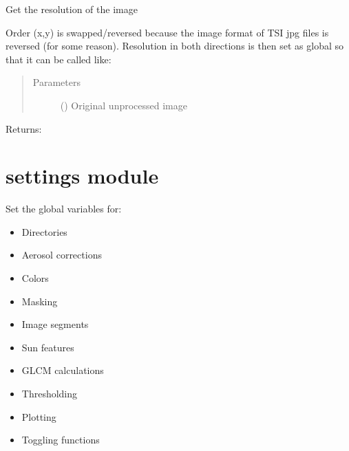 \documentclass[letterpaper,10pt,english]{sphinxmanual}
\begin{document}
\begin{fulllineitems}
\label{\detokenize{resolution:resolution.get_resolution}}
Get the resolution of the image

Order (x,y) is swapped/reversed because the image format of TSI jpg files is reversed (for some reason). Resolution
in both directions is then set as global so that it can be called like:

%
\begin{sphinxVerbatim}[commandchars=\\\{\}]
\end{sphinxVerbatim}
\begin{quote}\begin{description}
\item[{Parameters}] \leavevmode
{} () \textendash{} Original unprocessed image

\end{description}\end{quote}

Returns:

\end{fulllineitems}



\section{settings module}
\label{\detokenize{settings:settings-module}}\label{\detokenize{settings::doc}}\label{\detokenize{settings:module-settings}}
Set the global variables for:
\begin{itemize}
\item {} 
Directories

\item {} 
Aerosol corrections

\item {} 
Colors

\item {} 
Masking

\item {} 
Image segments

\item {} 
Sun features

\item {} 
GLCM calculations

\item {} 
Thresholding

\item {} 
Plotting

\item {} 
Toggling functions

\end{itemize}
\end{document}
